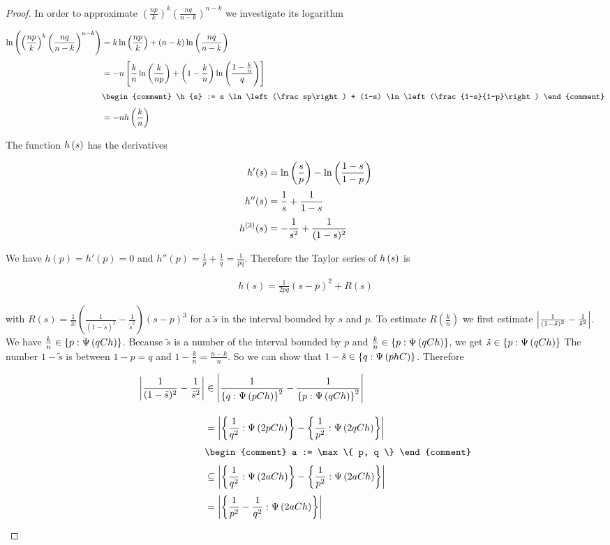 \begin{proof}
  \noindent In order to approximate $\left(\frac{np}{k}\right)^k \left(\frac{nq}{n-k}\right)^{n-k}$ we investigate its logarithm

  \begin{align}
    \ln\left(\left(\frac{np}{k}\right)^k \left(\frac{nq}{n-k}\right)^{n-k}\right) & = k \ln\left(\frac{np}{k}\right) + (n-k) \ln\left(\frac{nq}{n-k}\right) \nl
    &=-n \left[ \frac kn \ln\left(\frac{k}{np}\right) + \left(1-\frac kn\right) \ln\left(\frac{1-\frac kn}{q}\right)\right] \nl
    &
    \begin{comment}
      \h{s} := s \ln\left(\frac sp\right) + (1-s) \ln\left(\frac{1-s}{1-p}\right)
    \end{comment} \nl
    &=-n \h{\frac kn}
  \end{align}

  \noindent The function $\h{s}$ has the derivatives

  \begin{align}
    h'(s) &= \ln\left(\frac sp\right) - \ln\left(\frac{1-s}{1-p}\right) \nl
    h''(s) &= \frac 1s + \frac 1{1-s} \nl
    h^{(3)}(s) &= -\frac 1{s^2} + \frac 1{(1-s)^2}
  \end{align}

  \noindent We have $h(p)=h'(p)=0$ and $h''(p) = \frac 1p + \frac 1q = \frac 1{pq}$. Therefore the Taylor series of $\h{s}$ is

  \begin{align}
    h(s) = \frac{1}{2pq} (s-p)^2 + R(s)
  \end{align}

  with $R(s)=\frac{1}{3!} \left(\frac{1}{(1-\tilde s)^2}-\frac{1}{\tilde s^2}\right) (s-p)^3$ for a $\tilde s$ in the interval bounded by $s$ and $p$. To estimate $R\left(\frac kn\right)$ we first estimate $\abs{\frac{1}{(1-\tilde s)^2} - \frac{1}{\tilde s^2}}$. We have $\frac kn \in \ean[\bigpsi{qCh}]{p}$. Because $\tilde s$ is a number of the interval bounded by $p$ and $\frac kn\in\ean[\bigpsi{qCh}]{p}$, we get $\tilde s\in\ean[\bigpsi{qCh}]{p}$ The number $1-\tilde s$ is between $1-p=q$ and $1-\frac kn = \frac{n-k}{n}$. So we can show that $1-\tilde s\in \ean[\bigpsi{phC}]{q}$. Therefore

  \begin{align}
    \abs{\frac 1{(1-\tilde s)^2}-\frac 1{\tilde s^2}} & \in \abs{\frac 1{\ean[\bigpsi{pCh}]{q}^2} - \frac 1{\ean[\bigpsi{qCh}]{p}^2}} \bnl
    & = \abs{\ean[\bigpsi{2pCh}]{\frac 1{q^2}} - \ean[\bigpsi{2qCh}]{\frac 1{p^2}}} \nl
    &
    \begin{comment}
      a := \max\{ p, q \}
    \end{comment} \nl
    & \subseteq \abs{\ean[\bigpsi{2aCh}]{\frac{1}{q^2}} - \ean[\bigpsi{2aCh}]{\frac 1{p^2}}} \nl
    & = \abs{\ean[\bigpsi{2aCh}]{\frac 1{p^2}-\frac 1{q^2}}} \nl
  \end{align}


\end{proof}
